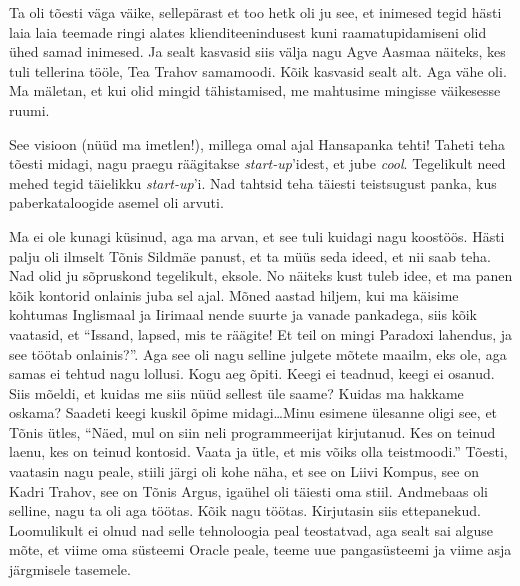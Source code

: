 Ta oli tõesti väga väike, sellepärast et too hetk oli ju see, et inimesed tegid 
hästi laia laia teemade ringi alates klienditeenindusest kuni raamatupidamiseni 
olid ühed samad inimesed. Ja sealt kasvasid siis välja nagu Agve 
Aasmaa näiteks, kes tuli tellerina tööle, Tea 
Trahov samamoodi. Kõik  kasvasid sealt alt. Aga vähe oli. Ma mäletan, et kui 
olid mingid tähistamised, me mahtusime mingisse väikesesse ruumi. 


See visioon (nüüd ma imetlen!), millega omal ajal Hansapanka 
tehti! Taheti teha tõesti midagi, nagu praegu räägitakse \emph{start-up}'idest, 
et jube \emph{cool}. Tegelikult need mehed tegid täielikku \emph{start-up}'i. 
Nad tahtsid teha täiesti teistsugust panka, kus  paberkataloogide asemel oli 
arvuti. 


Ma ei ole kunagi küsinud, aga ma arvan, et see tuli kuidagi nagu koostöös. 
Hästi palju oli  ilmselt Tõnis Sildmäe panust, et ta 
müüs seda ideed, et nii saab teha. Nad olid ju sõpruskond tegelikult, eksole. 
No näiteks kust tuleb idee, et ma panen kõik kontorid onlainis juba sel ajal. 
Mõned aastad hiljem, kui ma käisime kohtumas Inglismaal ja Iirimaal nende 
suurte ja vanade pankadega, siis kõik vaatasid, et \enquote{Issand, lapsed, mis 
te räägite! Et teil on mingi Paradoxi lahendus, ja see töötab onlainis?}. Aga 
see oli nagu selline julgete mõtete maailm, eks ole, aga samas ei tehtud nagu 
lollusi. Kogu aeg õpiti. Keegi ei teadnud, keegi ei osanud. Siis mõeldi, et 
kuidas me siis nüüd sellest üle saame? Kuidas ma hakkame oskama? Saadeti keegi 
kuskil õpime midagi\dots Minu esimene ülesanne oligi see, et 
Tõnis ütles, \enquote{Näed, mul on siin neli 
programmeerijat kirjutanud. Kes on teinud laenu, kes on teinud kontosid. Vaata 
ja ütle, et mis võiks olla teistmoodi.} Tõesti, vaatasin nagu peale, stiili 
järgi oli kohe näha, et see on Liivi Kompus, see on Kadri Trahov, see on Tõnis 
Argus, igaühel oli täiesti oma stiil. Andmebaas oli selline, nagu ta oli aga 
töötas. Kõik nagu töötas. Kirjutasin siis ettepanekud. Loomulikult ei olnud nad 
selle tehnoloogia peal teostatvad, aga sealt sai alguse mõte, et viime oma 
süsteemi Oracle peale, teeme uue pangasüsteemi ja viime asja järgmisele 
tasemele.

